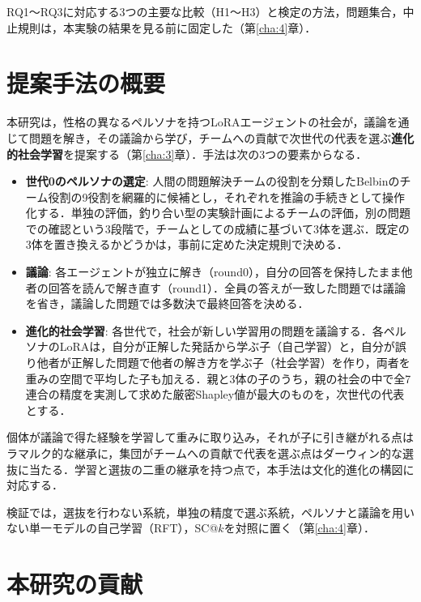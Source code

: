 RQ1〜RQ3に対応する3つの主要な比較（H1〜H3）と検定の方法，問題集合，中止規則は，本実験の結果を見る前に固定した（第\ref{cha:4}章）．

\section{提案手法の概要}
\label{sec:1.4}

本研究は，性格の異なるペルソナを持つLoRAエージェントの社会が，議論を通じて問題を解き，その議論から学び，チームへの貢献で次世代の代表を選ぶ\textbf{進化的社会学習}を提案する（第\ref{cha:3}章）．手法は次の3つの要素からなる．

\begin{itemize}
\item \textbf{世代0のペルソナの選定}: 人間の問題解決チームの役割を分類したBelbinのチーム役割\cite{belbin1981management,belbin1993team}の9役割を網羅的に候補とし，それぞれを推論の手続きとして操作化する．単独の評価，釣り合い型の実験計画によるチームの評価，別の問題での確認という3段階で，チームとしての成績に基づいて3体を選ぶ．既定の3体を置き換えるかどうかは，事前に定めた決定規則で決める．
\item \textbf{議論}: 各エージェントが独立に解き（round0），自分の回答を保持したまま他者の回答を読んで解き直す（round1）．全員の答えが一致した問題では議論を省き，議論した問題では多数決で最終回答を決める．
\item \textbf{進化的社会学習}: 各世代で，社会が新しい学習用の問題を議論する．各ペルソナのLoRAは，自分が正解した発話から学ぶ子（自己学習）と，自分が誤り他者が正解した問題で他者の解き方を学ぶ子（社会学習）を作り，両者を重みの空間で平均した子も加える．親と3体の子のうち，親の社会の中で全7連合の精度を実測して求めた厳密Shapley値が最大のものを，次世代の代表とする．
\end{itemize}

個体が議論で得た経験を学習して重みに取り込み，それが子に引き継がれる点はラマルク的な継承\cite{whitley1994lamarckian}に，集団がチームへの貢献で代表を選ぶ点はダーウィン的な選抜に当たる．学習と選抜の二重の継承を持つ点で，本手法は文化的進化\cite{boyd1985culture}の構図に対応する．

検証では，選抜を行わない系統，単独の精度で選ぶ系統，ペルソナと議論を用いない単一モデルの自己学習（RFT）\cite{zelikman2022star,yuan2023scaling}，SC@$k$を対照に置く（第\ref{cha:4}章）．

\section{本研究の貢献}
\label{sec:1.5}

